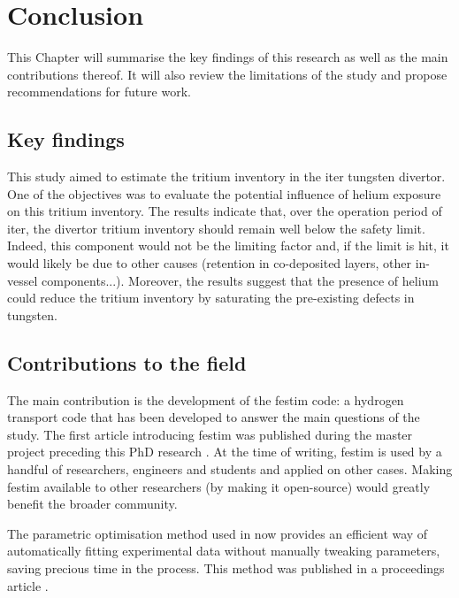 \setchapterpreamble[u]{\margintoc}
\chapter{Conclusion}

This Chapter will summarise the key findings of this research as well as the main contributions thereof.
It will also review the limitations of the study and propose recommendations for future work.

\section*{Key findings}

This study aimed to estimate the tritium inventory in the \gls{iter} tungsten \gls{divertor}.
One of the objectives was to evaluate the potential influence of helium exposure on this tritium inventory.
The results indicate that, over the operation period of \gls{iter}, the \gls{divertor} tritium inventory should remain well below the safety limit.
Indeed, this component would not be the limiting factor and, if the limit is hit, it would likely be due to other causes (retention in co-deposited layers, other in-vessel components...).
Moreover, the results suggest that the presence of helium could reduce the tritium inventory by saturating the pre-existing defects in tungsten.

\section*{Contributions to the field}
The main contribution is the development of the \gls{festim} code: a hydrogen transport code that has been developed to answer the main questions of the study.
The first article introducing \gls{festim} was published during the master project preceding this PhD research \cite{delaporte-mathurin_finite_2019}.
At the time of writing, \gls{festim} is used by a handful of researchers, engineers and students and applied on other cases.
Making \gls{festim} available to other researchers (by making it open-source) would greatly benefit the broader community.

The parametric optimisation method used in  now provides an efficient way of automatically fitting experimental data without manually tweaking parameters, saving precious time in the process.
This method was published in a proceedings article \cite{delaporte-mathurin_parametric_2021}.

